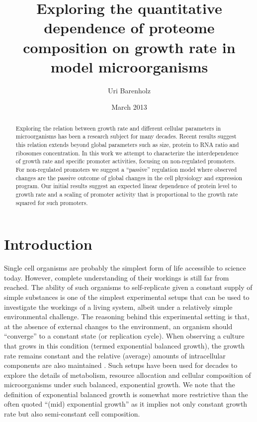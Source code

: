 \documentclass[a4page,notitlepage]{article}
\title{Exploring the quantitative dependence of proteome composition on growth rate in model microorganisms}
\author{Uri Barenholz}
\date{March 2013}
\begin{document}
\maketitle
\begin{abstract}
Exploring the relation between growth rate and different cellular parameters in microorganisms has been a research subject for many decades.
Recent results suggest this relation extends beyond global parameters such as size, protein to RNA ratio and ribosomes concentration.
In this work we attempt to characterize the interdependence of growth rate and specific promoter activities, focusing on non-regulated promoters.
For non-regulated promoters we suggest a ``passive'' regulation model where observed changes are the passive outcome of global changes in the cell physiology and expression program.
Our initial results suggest an expected linear dependence of protein level to growth rate and a scaling of promoter activity that is proportional to the growth rate squared for such promoters.
\end{abstract}
\clearpage
\tableofcontents

\section{Introduction}
Single cell organisms are probably the simplest form of life accessible to science today.
However, complete understanding of their workings is still far from reached.
The ability of such organisms to self-replicate given a constant supply of simple substances is one of the simplest experimental setups that can be used to investigate the workings of a living system, albeit under a relatively simple environmental challenge.
The reasoning behind this experimental setting is that, at the absence of external changes to the environment, an organism should “converge” to a constant state (or replication cycle).
When observing a culture that grows in this condition (termed exponential balanced growth), the growth rate remains constant and the relative (average) amounts of intracellular components are also maintained \cite{Campbell1957}.
Such setups have been used for decades \cite{Schaechter1958,Maaloe1969,Pedersen1978a} to explore the details of metabolism, resource allocation and cellular composition of microorganisms under such balanced, exponential growth.
We note that the definition of exponential balanced growth is somewhat more restrictive than the often quoted ``(mid) exponential growth'' as it implies not only constant growth rate but also semi-constant cell composition.
\end{document}
